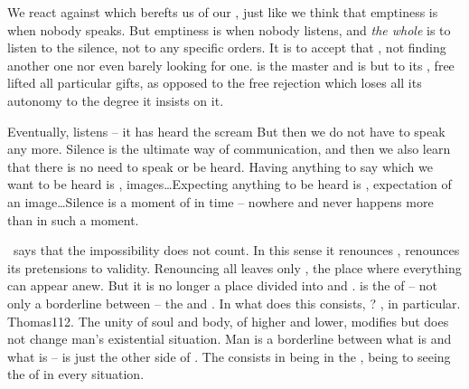 \pa\label{pa:filling} We react against  which berefts us of our
, just like we think that emptiness is when nobody speaks.  But
emptiness is when nobody listens, and {\em the whole}  is to
listen to the silence, not to any specific orders. It is to accept that , not finding another one nor even barely looking for
one.  
is the master and  is but  to its , free
 lifted  all particular gifts, as opposed to the free
rejection which loses all its autonomy to the degree it insists on it.

Eventually,  listens -- it has heard the scream 
But then we do not have to speak any more. Silence is the ultimate way of
communication, and then we also learn that there is no need to speak or be
heard. Having anything to say which we want to be heard is ,
images\ldots Expecting anything to be heard is , expectation of
an image\ldots Silence is a moment of  in time -- nowhere and never
happens more than in such a moment.

\pa \Yes\ says that the  impossibility does not count. In this sense it
renounces , renounces its pretensions to  validity. 
Renouncing
all  leaves only , the place where everything can
appear anew. But it is no longer a place divided into  and
.  is the  of -- not only a
borderline between -- the  and . 
In what does this  consists, ? , in
 particular.
\citet{Damn the flesh that depends on the soul. Damn the soul that
depends on the flesh.}{Thomas}{112. }
The  unity of {soul} and {body}, of {higher} 
and {lower}, modifies but does not change man's existential situation. 
Man is a borderline between what is  and what is 
--  is just the other side of . The  consists in
being  in the , being  to seeing the
 of  in every  situation.

